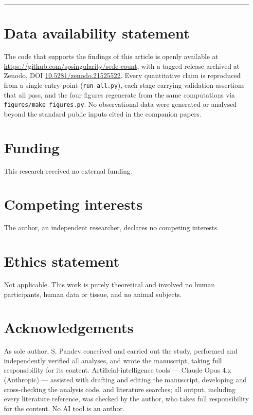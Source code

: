 \documentclass[12pt]{iopart}
\begin{document}
\begin{center}\rule{0.5\linewidth}{0.5pt}\end{center}

\section*{Data availability
statement}\label{data-availability-statement}

The code that supports the findings of this article is openly available
at \url{https://github.com/spsingularity/sede-count}, with a tagged
release archived at Zenodo, DOI
\href{https://doi.org/10.5281/zenodo.21525522}{10.5281/zenodo.21525522}.
Every quantitative claim is reproduced from a single entry point
(\texttt{run\_all.py}), each stage carrying validation assertions that
all pass, and the four figures regenerate from the same computations via
\texttt{figures/make\_figures.py}. No observational data were generated
or analysed beyond the standard public inputs cited in the companion
papers.

\section*{Funding}\label{funding}

This research received no external funding.

\section*{Competing interests}\label{competing-interests}

The author, an independent researcher, declares no competing interests.

\section*{Ethics statement}\label{ethics-statement}

Not applicable. This work is purely theoretical and involved no human
participants, human data or tissue, and no animal subjects.

\section*{Acknowledgements}\label{acknowledgements}

As sole author, S. Pandev conceived and carried out the study, performed
and independently verified all analyses, and wrote the manuscript,
taking full responsibility for its content. Artificial-intelligence
tools --- Claude Opus 4.x (Anthropic) --- assisted with drafting and
editing the manuscript, developing and cross-checking the analysis code,
and literature searches; all output, including every literature
reference, was checked by the author, who takes full responsibility for
the content. No AI tool is an author.


\end{document}
